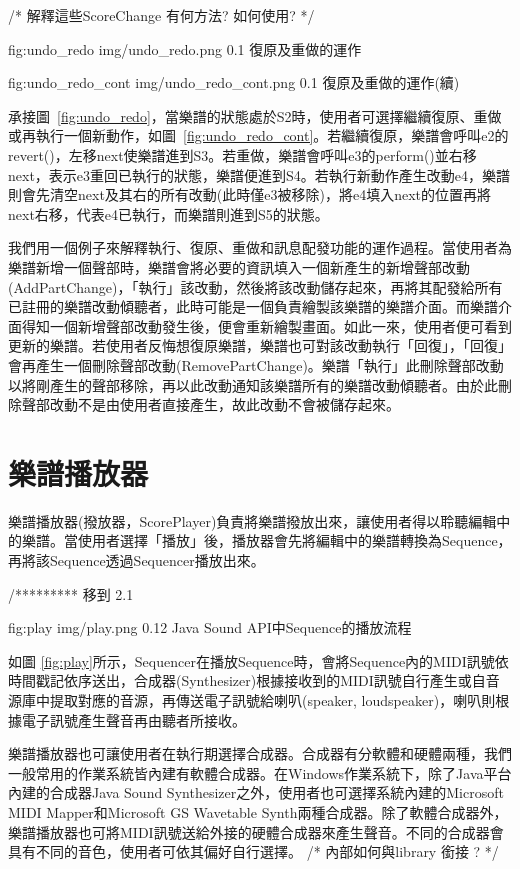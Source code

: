 \documentclass[12pt,a4paper,oneside]{report}
\begin{document}
/*  
解釋這些ScoreChange 有何方法? 如何使用?   
*/ 


\figurewithcaption
{fig:undo_redo}
{img/undo_redo.png}
{0.1}
{復原及重做的運作}

\figurewithcaption
{fig:undo_redo_cont}
{img/undo_redo_cont.png}
{0.1}
{復原及重做的運作(續)}

承接圖~\ref{fig:undo_redo}，當樂譜的狀態處於S2時，使用者可選擇繼續復原、重做或再執行一個新動作，如圖~\ref{fig:undo_redo_cont}。若繼續復原，樂譜會呼叫e2的revert()，左移next使樂譜進到S3。若重做，樂譜會呼叫e3的perform()並右移next，表示e3重回已執行的狀態，樂譜便進到S4。若執行新動作產生改動e4，樂譜則會先清空next及其右的所有改動(此時僅e3被移除)，將e4填入next的位置再將next右移，代表e4已執行，而樂譜則進到S5的狀態。

我們用一個例子來解釋執行、復原、重做和訊息配發功能的運作過程。當使用者為樂譜新增一個聲部時，樂譜會將必要的資訊填入一個新產生的新增聲部改動(AddPartChange)，「執行」該改動，然後將該改動儲存起來，再將其配發給所有已註冊的樂譜改動傾聽者，此時可能是一個負責繪製該樂譜的樂譜介面。而樂譜介面得知一個新增聲部改動發生後，便會重新繪製畫面。如此一來，使用者便可看到更新的樂譜。若使用者反悔想復原樂譜，樂譜也可對該改動執行「回復」，「回復」會再產生一個刪除聲部改動(RemovePartChange)。樂譜「執行」此刪除聲部改動以將剛產生的聲部移除，再以此改動通知該樂譜所有的樂譜改動傾聽者。由於此刪除聲部改動不是由使用者直接產生，故此改動不會被儲存起來。

\section{樂譜播放器} %
\label{sec:scorePlayer}

樂譜播放器(撥放器，ScorePlayer)負責將樂譜撥放出來，讓使用者得以聆聽編輯中的樂譜。當使用者選擇「播放」後，播放器會先將編輯中的樂譜轉換為Sequence，再將該Sequence透過Sequencer播放出來。

/*********  移到 2.1 

\figurewithcaption
{fig:play}
{img/play.png}
{0.12}
{Java Sound API中Sequence的播放流程}

如圖 \ref{fig:play}所示，Sequencer在播放Sequence時，會將Sequence內的MIDI訊號依時間戳記依序送出，合成器(Synthesizer)根據接收到的MIDI訊號自行產生或自音源庫中提取對應的音源，再傳送電子訊號給喇叭(speaker, loudspeaker)，喇叭則根據電子訊號產生聲音再由聽者所接收。



樂譜播放器也可讓使用者在執行期選擇合成器。合成器有分軟體和硬體兩種，我們一般常用的作業系統皆內建有軟體合成器。在Windows作業系統下，除了Java平台內建的合成器Java Sound Synthesizer之外，使用者也可選擇系統內建的Microsoft MIDI Mapper和Microsoft GS Wavetable Synth兩種合成器。除了軟體合成器外，樂譜播放器也可將MIDI訊號送給外接的硬體合成器來產生聲音。不同的合成器會具有不同的音色，使用者可依其偏好自行選擇。 /* 內部如何與library 銜接 ?  */
\end{document}
